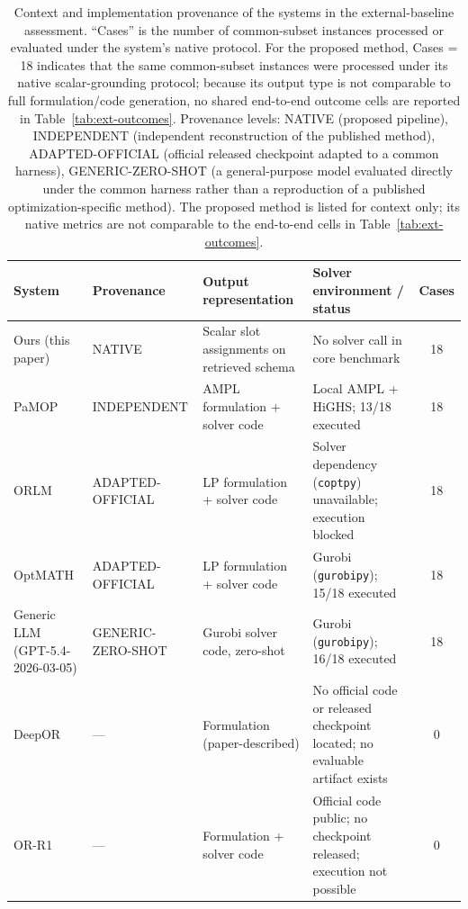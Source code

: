 \documentclass[pdflatex,sn-basic,Numbered]{sn-jnl}
\begin{document}
\begin{table}[t]
  \centering
  \caption{Context and implementation provenance of the systems in the external-baseline assessment. ``Cases'' is the number of common-subset instances processed or evaluated under the system's native protocol. For the proposed method, Cases = 18 indicates that the same common-subset instances were processed under its native scalar-grounding protocol; because its output type is not comparable to full formulation/code generation, no shared end-to-end outcome cells are reported in Table~\ref{tab:ext-outcomes}. Provenance levels: NATIVE (proposed pipeline), INDEPENDENT (independent reconstruction of the published method), ADAPTED-OFFICIAL (official released checkpoint adapted to a common harness), GENERIC-ZERO-SHOT (a general-purpose model evaluated directly under the common harness rather than a reproduction of a published optimization-specific method). The proposed method is listed for context only; its native metrics are not comparable to the end-to-end cells in Table~\ref{tab:ext-outcomes}.}
  \label{tab:ext-context}
  \small
  \setlength{\tabcolsep}{3pt}
  \renewcommand{\arraystretch}{1.15}
  \begin{tabular}{@{}>{\raggedright\arraybackslash}p{1.9cm}>{\raggedright\arraybackslash}p{2.6cm}>{\raggedright\arraybackslash}p{2.5cm}>{\raggedright\arraybackslash}p{3.55cm}c@{}}
    \toprule
    System & Provenance & Output representation & Solver environment / status & Cases \\
    \midrule
    Ours (this paper) & NATIVE & Scalar slot assignments on retrieved schema & No solver call in core benchmark & 18 \\
    PaMOP \cite{pan2025pamop} & INDEPENDENT & AMPL formulation + solver code & Local AMPL + HiGHS; 13/18 executed & 18 \\
    ORLM \cite{huang2025orlm} & ADAPTED- OFFICIAL & LP formulation + solver code & Solver dependency (\texttt{coptpy}) unavailable; execution blocked & 18 \\
    OptMATH \cite{lu2025optmath} & ADAPTED- OFFICIAL & LP formulation + solver code & Gurobi (\texttt{gurobipy}); 15/18 executed & 18 \\
    Generic LLM (GPT-5.4- 2026-03-05) & GENERIC- ZERO-SHOT & Gurobi solver code, zero-shot & Gurobi (\texttt{gurobipy}); 16/18 executed & 18 \\
    DeepOR \cite{xiao2026deepor} & --- & Formulation (paper-described) & No official code or released checkpoint located; no evaluable artifact exists & 0 \\
    OR-R1 \cite{ding2026orr1} & --- & Formulation + solver code & Official code public; no checkpoint released; execution not possible & 0 \\
    \bottomrule
  \end{tabular}
\end{table}
\end{document}
